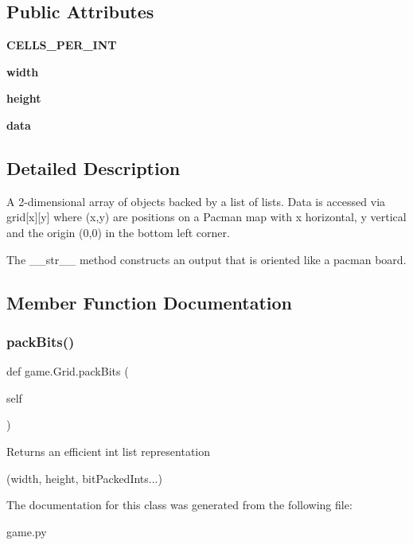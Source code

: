 \subsection*{Public Attributes}
\begin{DoxyCompactItemize}
\item 
\mbox{\label{classgame_1_1_grid_a1f1cd914b8cf1ff7caa66300968d1b55}} 
{\bfseries C\+E\+L\+L\+S\+\_\+\+P\+E\+R\+\_\+\+I\+NT}
\item 
\mbox{\label{classgame_1_1_grid_a106ada4249166c0c7ada9af0da1cace7}} 
{\bfseries width}
\item 
\mbox{\label{classgame_1_1_grid_aaa8c96b31123ef167b4e2df70244174c}} 
{\bfseries height}
\item 
\mbox{\label{classgame_1_1_grid_ae5f6f4dd2adda81b2db218c70a21694a}} 
{\bfseries data}
\end{DoxyCompactItemize}


\subsection{Detailed Description}
\begin{DoxyVerb}A 2-dimensional array of objects backed by a list of lists.  Data is accessed
via grid[x][y] where (x,y) are positions on a Pacman map with x horizontal,
y vertical and the origin (0,0) in the bottom left corner.

The __str__ method constructs an output that is oriented like a pacman board.
\end{DoxyVerb}
 

\subsection{Member Function Documentation}
\mbox{\label{classgame_1_1_grid_a4cd22a6adb8a287be07ee4f09e623a2d}} 
\subsubsection{\texorpdfstring{pack\+Bits()}{packBits()}}
{\footnotesize\ttfamily def game.\+Grid.\+pack\+Bits (\begin{DoxyParamCaption}\item[{}]{self }\end{DoxyParamCaption})}

\begin{DoxyVerb}Returns an efficient int list representation

(width, height, bitPackedInts...)
\end{DoxyVerb}
 

The documentation for this class was generated from the following file\+:\begin{DoxyCompactItemize}
\item 
game.\+py\end{DoxyCompactItemize}
